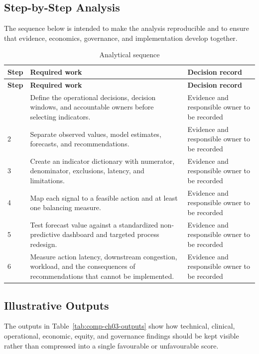 \subsection{Step-by-Step Analysis}
The sequence below is intended to make the analysis reproducible and to ensure
that evidence, economics, governance, and implementation develop together.

\begin{longtable}{@{}p{}p{}p{}@{}}
\caption{Analytical sequence}
\label{tab:comp-ch03-analysis-steps}\\
\toprule
\textbf{Step} & \textbf{Required work} & \textbf{Decision record} \\
\midrule
\endfirsthead
\toprule
\textbf{Step} & \textbf{Required work} & \textbf{Decision record} \\
\midrule
\endhead
\bottomrule
\endlastfoot
1 & Define the operational decisions, decision windows, and accountable owners before selecting indicators. & Evidence and responsible owner to be recorded \\
2 & Separate observed values, model estimates, forecasts, and recommendations. & Evidence and responsible owner to be recorded \\
3 & Create an indicator dictionary with numerator, denominator, exclusions, latency, and limitations. & Evidence and responsible owner to be recorded \\
4 & Map each signal to a feasible action and at least one balancing measure. & Evidence and responsible owner to be recorded \\
5 & Test forecast value against a standardized non-predictive dashboard and targeted process redesign. & Evidence and responsible owner to be recorded \\
6 & Measure action latency, downstream congestion, workload, and the consequences of recommendations that cannot be implemented. & Evidence and responsible owner to be recorded \\
\end{longtable}

\subsection{Illustrative Outputs}
The outputs in Table~\ref{tab:comp-ch03-outputs} show how technical,
clinical, operational, economic, equity, and governance findings should be kept
visible rather than compressed into a single favourable or unfavourable score.

